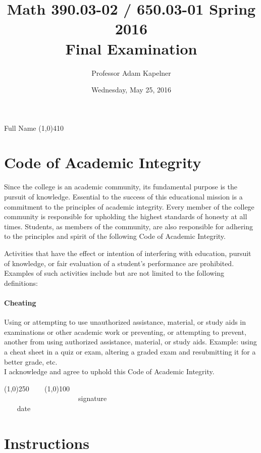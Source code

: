 \documentclass[12pt]{article}
\title{Math 390.03-02 / 650.03-01 Spring 2016 \\ Final Examination}
\author{Professor Adam Kapelner}
\date{Wednesday, May 25, 2016}
\begin{document}
\maketitle

\noindent Full Name \line(1,0){410}

\thispagestyle{empty}

\section*{Code of Academic Integrity}

\footnotesize
Since the college is an academic community, its fundamental purpose is the pursuit of knowledge. Essential to the success of this educational mission is a commitment to the principles of academic integrity. Every member of the college community is responsible for upholding the highest standards of honesty at all times. Students, as members of the community, are also responsible for adhering to the principles and spirit of the following Code of Academic Integrity.

Activities that have the effect or intention of interfering with education, pursuit of knowledge, or fair evaluation of a student's performance are prohibited. Examples of such activities include but are not limited to the following definitions:

\paragraph{Cheating} Using or attempting to use unauthorized assistance, material, or study aids in examinations or other academic work or preventing, or attempting to prevent, another from using authorized assistance, material, or study aids. Example: using a cheat sheet in a quiz or exam, altering a graded exam and resubmitting it for a better grade, etc.
\\

\noindent I acknowledge and agree to uphold this Code of Academic Integrity. \\

\begin{center}
\line(1,0){250} ~~~ \line(1,0){100}\\
~~~~~~~~~~~~~~~~~~~~~signature~~~~~~~~~~~~~~~~~~~~~~~~~~~~~~~~~~~~~~~~~~~~~ date
\end{center}

\normalsize

\section*{Instructions}
\end{document}
